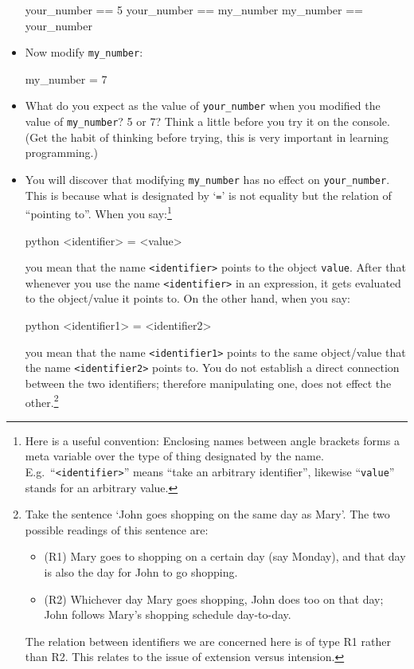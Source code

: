 \documentclass[a4paper]{article}
\begin{document}
\begin{itemize}
\begin{ucodeframe}
\begin{pyconsole}
your_number == 5 
your_number == my_number 
my_number == your_number 
\end{pyconsole}
\end{ucodeframe}

\item Now modify \Verb+my_number+:

\begin{ucodeframe}
\begin{pyconsole}
my_number = 7 
\end{pyconsole}
\end{ucodeframe}

\item What do you expect as the value of \Verb+your_number+ when you modified
the value of \Verb+my_number+? 5 or 7? Think a little before you try it on the
console. (Get the habit of thinking before trying, this is very important in
learning programming.)

\item You will discover that modifying \Verb+my_number+ has no effect on
\Verb+your_number+. This is because what is designated by `\Verb+=+' is not
equality but the relation of ``pointing to''. When you say:\footnote{Here is a
useful convention: Enclosing names between angle brackets forms a meta variable
over the type of thing designated by the name. E.g.\ ``\Verb+<identifier>+''
means ``take an arbitrary identifier'', likewise ``\Verb+value+'' stands for an
arbitrary value.}

\begin{pygments}[frame=single]{python}
<identifier> = <value>
\end{pygments}

you mean that the name \Verb+<identifier>+ points to the object \Verb+value+.
After that whenever you use the name \Verb+<identifier>+ in an expression, it
gets evaluated to the object/value it points to. On the other hand, when you
say:

\begin{pygments}[frame=single]{python}
<identifier1> = <identifier2>
\end{pygments}

you mean that the name \Verb+<identifier1>+ points to the same object/value that
the name \Verb+<identifier2>+ points to. You do not establish a direct
connection between the two identifiers; therefore manipulating one, does not
effect the other.\footnote{Take the sentence `John goes shopping on the same
day as Mary'. The two possible readings of this sentence are:
\begin{itemize}
\item[](R1) Mary goes to shopping on a certain day (say Monday), and that day is
also the day for John to go shopping.
\item[](R2) Whichever day Mary goes shopping, John does too on that day; John
follows Mary's shopping schedule day-to-day.  
\end{itemize} 
The relation between identifiers we are concerned here is of type R1 rather than R2. This relates to
the issue of extension versus intension.
}



\end{itemize}
\end{document}
